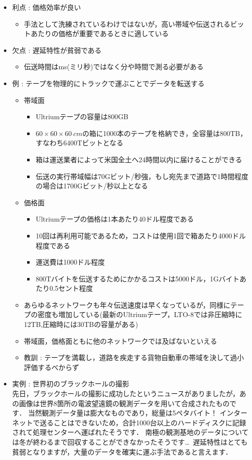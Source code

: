 \documentclass[a4paper]{ltjsarticle}
\begin{document}
			\begin{itemize}
				\item 利点 : 価格効率が良い
				\begin{itemize}
					\item 手法として洗練されているわけではないが，高い帯域や伝送されるビットあたりの価格が重要であるときに適している
				\end{itemize}
				\item 欠点 : 遅延特性が貧弱である
				\begin{itemize}
					\item 伝送時間は\si{ms}(ミリ秒)ではなく分や時間で測る必要がある
				\end{itemize}
				\item 例 : テープを物理的にトラックで運ぶことでデータを転送する
				\begin{itemize}
					\item 帯域面
					\begin{itemize}
						\item Ultriumテープの容量は800GB
						\item $60 \times 60 \times \SI{60}{cm}$の箱に1000本のテープを格納でき，全容量は800TB，すなわち6400Tビットとなる
						\item 箱は運送業者によって米国全土へ24時間以内に届けることができる
						\item 伝送の実行帯域幅は70Gビット/秒強，もし宛先まで道路で1時間程度の場合は1700Gビット/秒以上となる
					\end{itemize}
					\item 価格面
					\begin{itemize}
						\item Ultriumテープの価格は1本あたり40ドル程度である
						\item 10回は再利用可能であるため，コストは使用1回で箱あたり4000ドル程度である
						\item 運送費は1000ドル程度
						\item 800Tバイトを伝送するためにかかるコストは5000ドル，1Gバイトあたり0.5セント程度
					\end{itemize}
					\item あらゆるネットワークも年々伝送速度は早くなっているが，同様にテープの密度も増加している(最新のUltriumテープ，LTO-8では非圧縮時に12TB,圧縮時には30TBの容量がある)
					\item 帯域面，価格面ともに他のネットワークでは及ばないといえる
					\item 教訓 : テープを満載し，道路を疾走する貨物自動車の帯域を決して過小評価するべからず
				\end{itemize}
				\item 実例 : 世界初のブラックホールの撮影\\
					先日，ブラックホールの撮影に成功したというニュースがありましたが，あの画像は世界8箇所の電波望遠鏡の観測データを用いて合成されたものです．
					当然観測データ量は膨大なものであり，総量は5ペタバイト！
					インターネットで送ることはできないため，合計1000台以上のハードディスクに記録されて処理センターへ運ばれたそうです．
					南極の観測基地のデータについては冬が終わるまで回収することができなかったそうです\dots\ 
					遅延特性はとても貧弱となりますが，大量のデータを確実に運ぶ手法であると言えます．
			\end{itemize}
\end{document}
